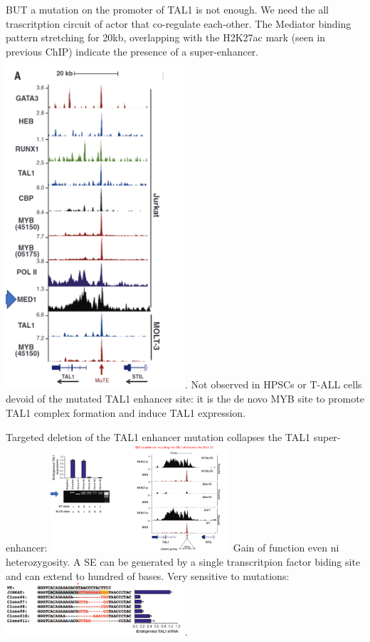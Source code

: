 BUT a mutation on the promoter of TAL1 is not enough. We need the all trascritption circuit of actor that co-regulate each-other. The Mediator binding pattern stretching for 20kb, overlapping with the H2K27ac mark (seen in previous ChIP) indicate the presence of a super-enhancer.
\includegraphics[width=0.5\textwidth]{../_resources/c55a73c929224da923f319503c218451.png}.
Not observed in HPSCs or T-ALL cells devoid of the mutated TAL1 enhancer site: it is the de novo MYB site to promote TAL1 complex formation and induce TAL1 expression.

Targeted deletion of the TAL1 enhancer mutation collapses the TAL1 super-enhancer:
\includegraphics[width=0.5\textwidth]{../_resources/dfb8371fc17e078308c3d5aa247ebcbf.png}
Gain of function even ni heterozygosity. A SE can be generated by a single transcritpion factor biding site and can extend to hundred of bases. Very sensitive to mutations:
\includegraphics[width=0.5\textwidth]{../_resources/fa5ffb6bbc02eb321a2991a3bcfd92c4.png}.

